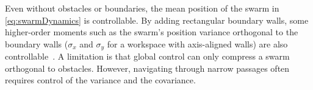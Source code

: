Even without obstacles or boundaries, the mean position of the swarm in \eqref{eq:swarmDynamics} is controllable.  By adding rectangular boundary walls, some higher-order moments such as the swarm's position variance orthogonal to the boundary walls ($\sigma_x$ and $\sigma_y$ for a workspace with axis-aligned walls) are also controllable~\citep{ShahrokhiIROS2015}. 
A limitation is that global control can only compress a swarm orthogonal to obstacles.  However, navigating through narrow passages often requires control of the variance and the covariance.


